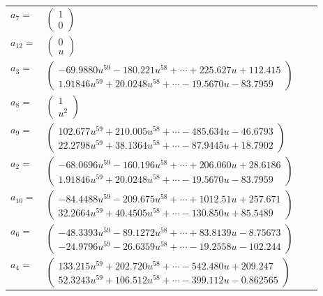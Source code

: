\documentclass[1p]{elsarticle_modified}
\theoremstyle{definition}
\begin{document}
\begin{tabular}{m{7pt} m{180pt} m{7pt} m{180pt} }
\flushright $a_{7}=$&$\begin{pmatrix}1\\0\end{pmatrix}$ \\
\flushright $a_{12}=$&$\begin{pmatrix}0\\u\end{pmatrix}$ \\
\flushright $a_{3}=$&$\begin{pmatrix}-69.9880 u^{59}-180.221 u^{58}+\cdots+225.627 u+112.415\\1.91846 u^{59}+20.0248 u^{58}+\cdots-19.5670 u-83.7959\end{pmatrix}$ \\
\flushright $a_{8}=$&$\begin{pmatrix}1\\u^2\end{pmatrix}$ \\
\flushright $a_{9}=$&$\begin{pmatrix}102.677 u^{59}+210.005 u^{58}+\cdots-485.634 u-46.6793\\22.2798 u^{59}+38.1364 u^{58}+\cdots-87.9445 u+18.7902\end{pmatrix}$ \\
\flushright $a_{2}=$&$\begin{pmatrix}-68.0696 u^{59}-160.196 u^{58}+\cdots+206.060 u+28.6186\\1.91846 u^{59}+20.0248 u^{58}+\cdots-19.5670 u-83.7959\end{pmatrix}$ \\
\flushright $a_{10}=$&$\begin{pmatrix}-84.4488 u^{59}-209.675 u^{58}+\cdots+1012.51 u+257.671\\32.2664 u^{59}+40.4505 u^{58}+\cdots-130.850 u+85.5489\end{pmatrix}$ \\
\flushright $a_{6}=$&$\begin{pmatrix}-48.3393 u^{59}-89.1272 u^{58}+\cdots+83.8139 u-8.75673\\-24.9796 u^{59}-26.6359 u^{58}+\cdots-19.2558 u-102.244\end{pmatrix}$ \\
\flushright $a_{4}=$&$\begin{pmatrix}133.215 u^{59}+202.720 u^{58}+\cdots-542.480 u+209.247\\52.3243 u^{59}+106.512 u^{58}+\cdots-399.112 u-0.862565\end{pmatrix}$ \\

\end{tabular}
\end{document}
